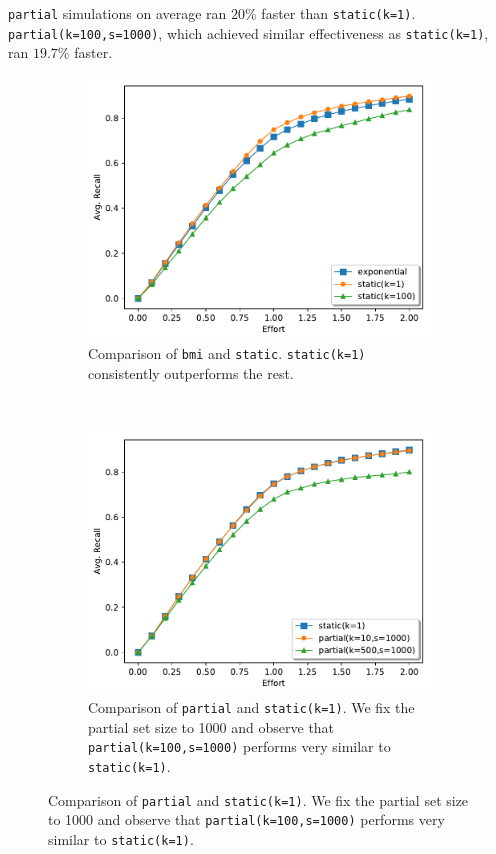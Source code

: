 \texttt{partial} simulations on average ran $20\%$ faster than
\texttt{static(k=1)}. \texttt{partial(k=100,s=1000)}, which achieved similar
effectiveness as \texttt{static(k=1)}, ran $19.7\%$ faster.

\begin{figure}
    \centering
    \begin{subfigure}[t]{0.48\textwidth}
        \centering
        \includegraphics[width=\textwidth]{plots/bmi_static.pdf}
        \caption{Comparison of \texttt{bmi} and \texttt{static}.
            \texttt{static(k=1)} consistently outperforms the rest.}
        \label{plot:bmi_static}
    \end{subfigure}
    ~
    \begin{subfigure}[t]{0.48\textwidth}
        \centering
        \includegraphics[width=\textwidth]{plots/static_partial.pdf}
        \caption{Comparison of \texttt{partial} and \texttt{static(k=1)}. We fix
            the partial set size to 1000 and observe that
            \texttt{partial(k=100,s=1000)} performs very similar to
        \texttt{static(k=1)}.}
        \label{plot:partial1}
    \end{subfigure}


\end{figure}
